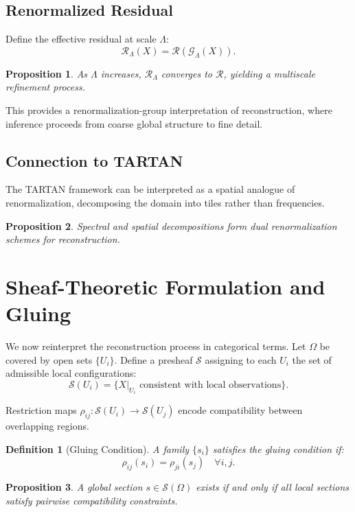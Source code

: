 \documentclass[12pt]{article}
\newtheorem{definition}{Definition}
\newtheorem{proposition}{Proposition}
\begin{document}
\subsection{Renormalized Residual}

Define the effective residual at scale $\Lambda$:
\[
\mathcal{R}_\Lambda(X) = \mathcal{R}(\mathcal{G}_\Lambda(X)).
\]

\begin{proposition}
As $\Lambda$ increases, $\mathcal{R}_\Lambda$ converges to $\mathcal{R}$, yielding a multiscale refinement process.
\end{proposition}

This provides a renormalization-group interpretation of reconstruction, where inference proceeds from coarse global structure to fine detail.

\subsection{Connection to TARTAN}

The TARTAN framework can be interpreted as a spatial analogue of renormalization, decomposing the domain into tiles rather than frequencies.

\begin{proposition}
Spectral and spatial decompositions form dual renormalization schemes for reconstruction.
\end{proposition}

\section{Sheaf-Theoretic Formulation and Gluing}

We now reinterpret the reconstruction process in categorical terms. Let $\Omega$ be covered by open sets $\{U_i\}$. Define a presheaf $\mathcal{S}$ assigning to each $U_i$ the set of admissible local configurations:
\[
\mathcal{S}(U_i) = \{ X|_{U_i} \text{ consistent with local observations} \}.
\]

Restriction maps $\rho_{ij} : \mathcal{S}(U_i) \to \mathcal{S}(U_j)$ encode compatibility between overlapping regions.

\begin{definition}[Gluing Condition]
A family $\{s_i\}$ satisfies the gluing condition if:
\[
\rho_{ij}(s_i) = \rho_{ji}(s_j) \quad \forall i,j.
\]
\end{definition}

\begin{proposition}
A global section $s \in \mathcal{S}(\Omega)$ exists if and only if all local sections satisfy pairwise compatibility constraints.
\end{proposition}
\end{document}
